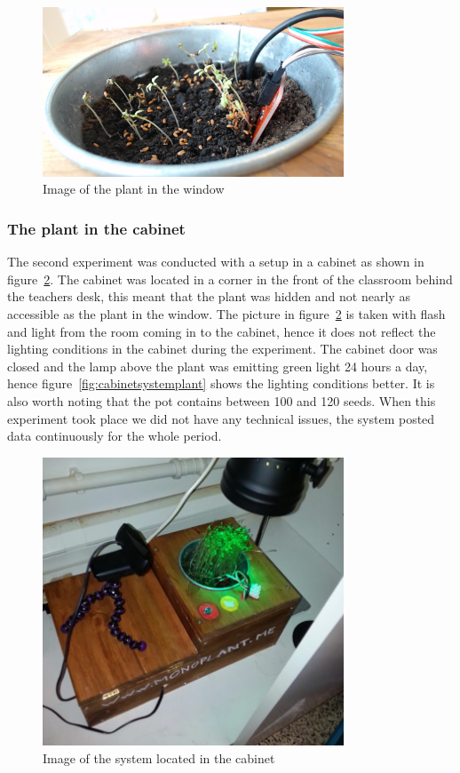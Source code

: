 \begin{figure}
\centering
\includegraphics[width=0.8\textwidth]{img/empiricalsetting/windowsystem.jpg}
\caption{Image of the plant in the window}
\label{fig:windowsystemplant}
\end{figure}



\subsubsection*{The plant in the cabinet}
The second experiment was conducted with a setup in a cabinet as shown in figure~\ref{fig:cabinetplant}. The cabinet was located in a corner in the front of the classroom behind the teachers desk, this meant that the plant was hidden and not nearly as accessible as the plant in the window. The picture in figure~\ref{fig:cabinetplant} is taken with flash and light from the room coming in to the cabinet, hence it does not reflect the lighting conditions in the cabinet during the experiment. The cabinet door was closed and the lamp above the plant was emitting green light 24 hours a day, hence figure~\ref{fig:cabinetsystemplant} shows the lighting conditions better. It is also worth noting that the pot contains between 100 and 120 seeds. When this experiment took place we did not have any technical issues, the system posted data continuously for the whole period.

\begin{figure}
\centering
\includegraphics[width=0.8\textwidth]{img/empiricalsetting/cupboard.jpg}
\caption{Image of the system located in the cabinet}
\label{fig:cabinetplant}
\end{figure}

